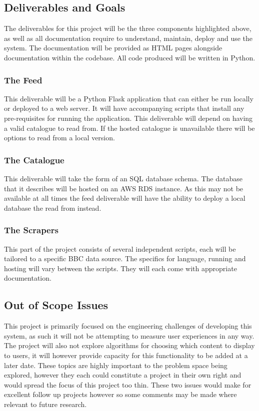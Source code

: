 \documentclass[12pt,titlepage]{article}
\begin{document}
  \subsection{Deliverables and Goals}

  The deliverables for this project will be the three components highlighted
  above, as well as all documentation require to understand, maintain, deploy
  and use the system. The documentation will be provided as HTML pages alongside
  documentation within the codebase. All code produced will be written in
  Python.

    \subsubsection{The Feed}

    This deliverable will be a Python Flask application that can either be run
    locally or deployed to a web server. It will have accompanying scripts that
    install any pre-requisites for running the application. This deliverable
    will depend on having a valid catalogue to read from. If the hosted
    catalogue is unavailable there will be options to read from a local version.

    \subsubsection{The Catalogue}

    This deliverable will take the form of an SQL database schema. The database
    that it describes will be hosted on an AWS RDS instance. As this may not be
    available at all times the feed deliverable will have the ability to deploy
    a local database the read from instead.

    \subsubsection{The Scrapers}

    This part of the project consists of several independent scripts, each will
    be tailored to a specific BBC data source. The specifics for language,
    running and hosting will vary between the scripts. They will each come with
    appropriate documentation.

  \subsection{Out of Scope Issues}

  This project is primarily focused on the engineering challenges of developing
  this system, as such it will not be attempting to measure user experiences in
  any way. The project will also not explore algorithms for choosing which
  content to display to users, it will however provide capacity for this
  functionality to be added at a later date. These topics are highly important
  to the problem space being explored, however they each could constitute a
  project in their own right and would spread the focus of this project too
  thin. These two issues would make for excellent follow up projects however so
  some comments may be made where relevant to future research.
\end{document}
